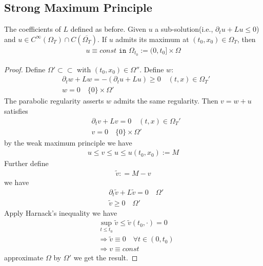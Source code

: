\subsection{Strong Maximum Principle}
\begin{theorem}
The coefficients of $L$ defined as before. 
Given $u$ a sub-solution(i.e., $\partial_t u + L u \le 0$) and $u \in C^\infty(\Omega_T) \cap C(\overline{\Omega_T})$. If $u$ admits its maximum at $(t_0, x_0) \in \Omega_T$, then 
\begin{align*}
	u \equiv const \texttt{ in } \Omega_{t_0}:= (0, t_0] \times \Omega
\end{align*}
\end{theorem}
\begin{proof}
Define $\Omega' \subset\subset$ with $(t_0, x_0) \in \Omega''$.
	Define $w$: 
	\begin{align*}
		&\partial_t w + Lw = -(\partial_t u + L u) \ge 0 \quad (t, x) \in \Omega_T'\\
		& w = 0 \quad \{0\} \times \Omega'
	\end{align*}
	The parabolic regularity asserts $w$ admits the same regularity. Then $v = w + u$ satisfies
	\begin{align*}
		& \partial_t v + Lv = 0 \quad (t, x) \in \Omega_T'\\
		& v = 0 \quad \{0\} \times \Omega'
	\end{align*}
	by the weak maximum principle we have
	\begin{align*}
		u \le v \le u \le u(t_0, x_0) := M
	\end{align*}
	Further define
	\begin{align*}
		\tilde{v}: = M - v
	\end{align*}
	we have
	\begin{align*}
		&\partial_t \tilde{v} + L\tilde{v} = 0 \quad \Omega' \\
		&\tilde{v} \ge 0 \quad \Omega'
	\end{align*}
	Apply Harnack's inequality we have
	\begin{align*}
		&\sup_{t \le t_0} \tilde{v} \le \tilde{v}(t_0, \cdot) = 0\\
		&\Rightarrow \tilde{v} \equiv 0 \quad \forall t \in (0, t_0)\\
		&\Rightarrow v \equiv const
	\end{align*}
	approximate $\Omega$ by $\Omega'$ we get the result. 
\end{proof}
 
 


